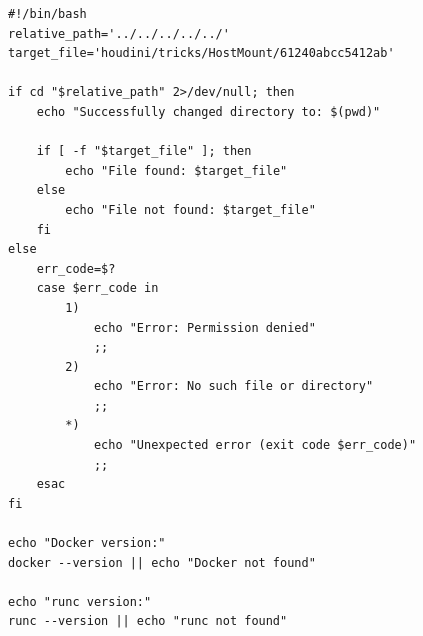 \begin{listing}[h!]
\caption{Trick Implementation for Case Study I}
\label{lst:pythoncase1}
\begin{verbatim}
#!/bin/bash
relative_path='../../../../../'
target_file='houdini/tricks/HostMount/61240abcc5412ab'

if cd "$relative_path" 2>/dev/null; then
    echo "Successfully changed directory to: $(pwd)"

    if [ -f "$target_file" ]; then
        echo "File found: $target_file"
    else
        echo "File not found: $target_file"
    fi
else
    err_code=$?
    case $err_code in
        1)
            echo "Error: Permission denied"
            ;;
        2)
            echo "Error: No such file or directory"
            ;;
        *)
            echo "Unexpected error (exit code $err_code)"
            ;;
    esac
fi

echo "Docker version:"
docker --version || echo "Docker not found"

echo "runc version:"
runc --version || echo "runc not found"

\end{verbatim}
\end{listing}


